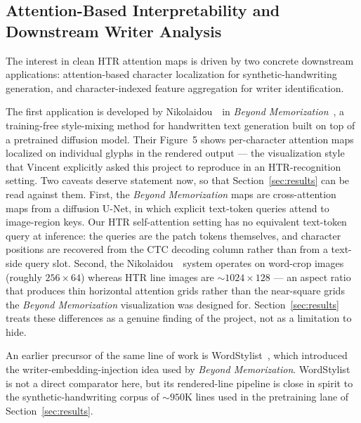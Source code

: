 \subsection{Attention-Based Interpretability and Downstream Writer Analysis}
\label{sec:rw_interp}

The interest in clean HTR attention maps is driven by two concrete downstream applications: attention-based character localization for synthetic-handwriting generation, and character-indexed feature aggregation for writer identification.

The first application is developed by Nikolaidou~\etal\ in \emph{Beyond Memorization}~\cite{nikolaidou2024beyondmem}, a training-free style-mixing method for handwritten text generation built on top of a pretrained diffusion model. Their Figure~5 shows per-character attention maps localized on individual glyphs in the rendered output --- the visualization style that Vincent explicitly asked this project to reproduce in an HTR-recognition setting. Two caveats deserve statement now, so that Section~\ref{sec:results} can be read against them. First, the \emph{Beyond Memorization} maps are cross-attention maps from a diffusion U-Net, in which explicit text-token queries attend to image-region keys. Our HTR self-attention setting has no equivalent text-token query at inference: the queries are the patch tokens themselves, and character positions are recovered from the CTC decoding column rather than from a text-side query slot. Second, the Nikolaidou~\etal\ system operates on word-crop images (roughly $256 \times 64$) whereas HTR line images are ${\sim}1024 \times 128$ --- an aspect ratio that produces thin horizontal attention grids rather than the near-square grids the \emph{Beyond Memorization} visualization was designed for. Section~\ref{sec:results} treats these differences as a genuine finding of the project, not as a limitation to hide.

An earlier precursor of the same line of work is WordStylist~\cite{nikolaidou2023wordstylist}, which introduced the writer-embedding-injection idea used by \emph{Beyond Memorization}. WordStylist is not a direct comparator here, but its rendered-line pipeline is close in spirit to the synthetic-handwriting corpus of ${\sim}950$K lines used in the pretraining lane of Section~\ref{sec:results}.

